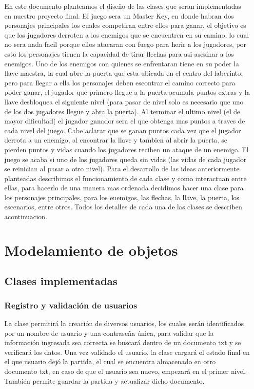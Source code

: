\documentclass{article}
\begin{document}
En este documento planteamos el diseño de las clases que seran implementadas en nuestro proyecto final. El juego sera un Master Key, en donde habran dos personajes principales los cuales competiran entre ellos para ganar, el objetivo es que los jugadores derroten a los enemigos que se encuentren en su camino, lo cual no sera nada facil porque ellos atacaran con fuego para herir a los jugadores, por esto los personajes tienen la capacidad de tirar flechas para asi asesinar a los enemigos. Uno de los enemigos con quienes se enfrentaran tiene en su poder la llave maestra, la cual abre la puerta que esta ubicada en el centro del laberinto, pero para llegar a ella los personajes deben escontrar el camino correcto para poder ganar, el jugador que primero llegue a la puerta acumula puntos extras y la llave desbloquea el siguiente nivel (para pasar de nivel solo es necesario que uno de los dos jugadores llegue y abra la puerta). Al terminar el ultimo nivel (el de mayor dificultad) el jugador ganador sera el que obtenga mas puntos a traves de cada nivel del juego. Cabe aclarar que se ganan puntos cada vez que el jugador derrota a un enemigo, al encontrar la llave y tambien al abrir la puerta, se pierden puntos y vidas cuando los jugadores reciben un ataque de un enemigo. El juego se acaba si uno de los jugadores queda sin vidas (las vidas de cada jugador se reinician al pasar a otro nivel). Para el desarrollo de las ideas anteriormente planteadas describimos el funcionamiento de cada clase y como interactuan entre ellas, para hacerlo de una manera mas ordenada decidimos hacer una clase para los personajes principales, para los enemigos, las flechas, la llave, la puerta, los escenarios, entre otros. Todos los detalles de cada una de las clases se describen acontinuacion.

\section{Modelamiento de objetos} \label{Modelamiento de objetos}

\subsection{Clases implementadas}

\subsubsection{Registro y validación de usuarios}

La clase permitirá la creación de diversos usuarios, los cuales serán identificados por un nombre de usuario y una contraseña única, para validar que la información ingresada sea correcta se buscará dentro de un documento txt y se verificará los datos. Una vez validado el usuario, la clase cargará el estado final en el que usuario dejó la partida, el cual se encuentra almacenado en otro documento txt, en caso de que el usuario sea nuevo, empezará en el primer nivel. También permite guardar la partida y actualizar dicho documento.
\end{document}

